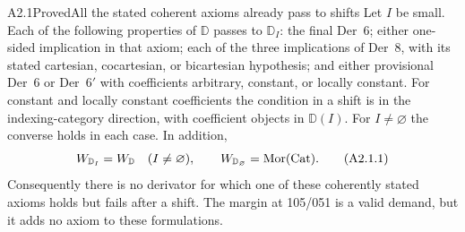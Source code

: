 \begin{claim}{A2.1}{Proved}{All the stated coherent axioms already pass to shifts}
\label{A2-shifts}
Let $I$ be small. Each of the following properties of $\mathbb D$ passes to
$\mathbb D_I$: the final Der~6; either one-sided implication in that axiom;
each of the three implications of Der~8, with its stated cartesian,
cocartesian, or bicartesian hypothesis; and either provisional Der~6 or
Der~$6'$ with coefficients arbitrary, constant, or locally constant. For
constant and locally constant coefficients the condition in a shift is in
the indexing-category direction, with coefficient objects in $\mathbb D(I)$.
For $I\ne\varnothing$ the converse holds in each case. In addition,
\[
 W_{\mathbb D_I}=W_{\mathbb D}\quad(I\ne\varnothing),
 \qquad W_{\mathbb D_\varnothing}=\operatorname{Mor}(\mathrm{Cat}).
 \tag{A2.1.1}
\]
Consequently there is no derivator for which one of these coherently stated
axioms holds but fails after a shift. The margin at 105/051 is a valid demand,
but it adds no axiom to these formulations.
\end{claim}
